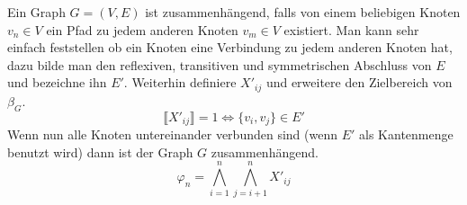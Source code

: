 \documentclass[a4paper,10pt]{article}
\begin{document}
\begin{enumerate}
Ein Graph $G = (V,E)$ ist zusammenhängend, falls von einem beliebigen Knoten $v_n \in V$ ein Pfad zu jedem anderen Knoten $v_m \in V$ existiert. Man kann sehr einfach feststellen ob ein Knoten eine Verbindung zu jedem anderen Knoten hat, dazu bilde man den reflexiven, transitiven und symmetrischen Abschluss von $E$ und bezeichne ihn $E'$. Weiterhin definiere  $X'_{ij}$ und erweitere den Zielbereich von $\beta_G$.
$$\llbracket X'_{ij} \rrbracket = 1 \Leftrightarrow \{v_i,v_j\} \in E'$$
Wenn nun alle Knoten untereinander verbunden sind (wenn $E'$ als Kantenmenge benutzt wird) dann ist der Graph $G$ zusammenhängend.
$$\varphi_n = \bigwedge_{i=1}^n\bigwedge_{j=i+1}^n X'_{ij}$$



\end{enumerate}
\end{document}
